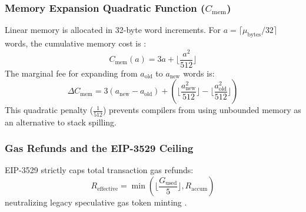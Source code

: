 \documentclass[conference]{IEEEtran}
\begin{document}
\subsubsection{Memory Expansion Quadratic Function ($C_{\text{mem}}$)}
Linear memory is allocated in 32-byte word increments. For $a = \lceil \mu_{\text{bytes}} / 32 \rceil$ words, the cumulative memory cost is \cite{wood2014ethereum}:
\begin{equation}
C_{\text{mem}}(a) = 3a + \Big\lfloor \frac{a^2}{512} \Big\rfloor
\end{equation}
The marginal fee for expanding from $a_{\text{old}}$ to $a_{\text{new}}$ words is:
\begin{equation}
\Delta C_{\text{mem}} = 3(a_{\text{new}} - a_{\text{old}}) + \left( \Big\lfloor \frac{a_{\text{new}}^2}{512} \Big\rfloor - \Big\lfloor \frac{a_{\text{old}}^2}{512} \Big\rfloor \right)
\end{equation}
This quadratic penalty ($\frac{1}{512}$) prevents compilers from using unbounded memory as an alternative to stack spilling.

\subsubsection{Gas Refunds and the EIP-3529 Ceiling}
EIP-3529 strictly caps total transaction gas refunds:
\begin{equation}
R_{\text{effective}} = \min\left( \Big\lfloor \frac{G_{\text{used}}}{5} \Big\rfloor, R_{\text{accum}} \right)
\end{equation}
neutralizing legacy speculative gas token minting \cite{eip3529}.
\end{document}
